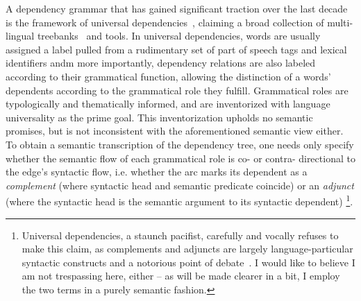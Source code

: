 A dependency grammar that has gained significant traction over the last decade is the framework of universal dependencies~\cite{10.1162/coli_a_00402}, claiming a broad collection of multi-lingual treebanks~\cite{nivre2020universal} and tools.
In universal dependencies, words are usually assigned a label pulled from a rudimentary set of part of speech tags and lexical identifiers andm more importantly, dependency relations are also labeled according to their grammatical function, allowing the distinction of a words' dependents according to the grammatical role they fulfill.
Grammatical roles are typologically and thematically informed, and are inventorized with language universality as the prime goal.
This inventorization upholds no semantic promises, but is not inconsistent with the aforementioned semantic view either.
To obtain a semantic transcription of the dependency tree, one needs only specify whether the semantic flow of each grammatical role is co- or contra- directional to the edge's syntactic flow, i.e. whether the arc marks its dependent as a \textit{complement} (where syntactic head and semantic predicate coincide) or an \textit{adjunct} (where the syntactic head is the semantic argument to its syntactic dependent)%
	\footnote{Universal dependencies, a staunch pacifist, carefully and vocally refuses to make this claim, as complements and adjuncts are largely language-particular syntactic constructs and a notorious point of debate~\cite{haspelmath2014arguments}.
	I would like to believe I am not trespassing here, either -- as will be made clearer in a bit, I employ the two terms in a purely semantic fashion.}.

